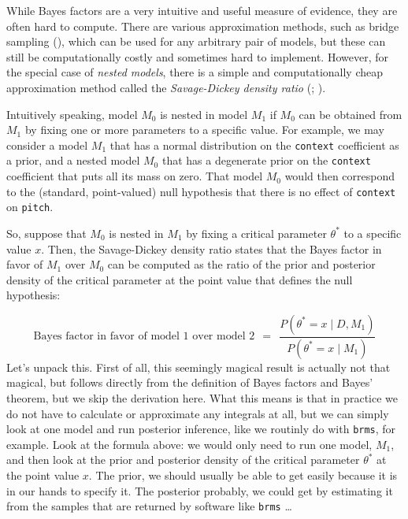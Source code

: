 \documentclass[
  doc,
  floatsintext,
  longtable,
  nolmodern,
  notxfonts,
  notimes,
  colorlinks=true,linkcolor=blue,citecolor=blue,urlcolor=blue]{apa7}
\begin{document}
While Bayes factors are a very intuitive and useful measure of evidence,
they are often hard to compute. There are various approximation methods,
such as bridge sampling
(), which can be used for any arbitrary pair of models, but these
can still be computationally costly and sometimes hard to implement.
However, for the special case of \emph{nested models}, there is a simple
and computationally cheap approximation method called the
\emph{Savage-Dickey density ratio}
(;
).

Intuitively speaking, model \(M_0\) is nested in model \(M_1\) if
\(M_0\) can be obtained from \(M_1\) by fixing one or more parameters to
a specific value. For example, we may consider a model \(M_1\) that has
a normal distribution on the \texttt{context} coefficient as a prior,
and a nested model \(M_0\) that has a degenerate prior on the
\texttt{context} coefficient that puts all its mass on zero. That model
\(M_0\) would then correspond to the (standard, point-valued) null
hypothesis that there is no effect of \texttt{context} on
\texttt{pitch}.

So, suppose that \(M_0\) is nested in \(M_1\) by fixing a critical
parameter \(\theta^*\) to a specific value \(x\). Then, the
Savage-Dickey density ratio states that the Bayes factor in favor of
\(M_1\) over \(M_0\) can be computed as the ratio of the prior and
posterior density of the critical parameter at the point value that
defines the null hypothesis:

\[
\text{Bayes factor in favor of model 1 over model 2} \ \  = \ \  \frac{P(\theta^*=x \mid D, M_1)}{P(\theta^*=x \mid M_1)}
\] Let's unpack this. First of all, this seemingly magical result is
actually not that magical, but follows directly from the definition of
Bayes factors and Bayes' theorem, but we skip the derivation here. What
this means is that in practice we do not have to calculate or
approximate any integrals at all, but we can simply look at one model
and run posterior inference, like we routinly do with \texttt{brms}, for
example. Look at the formula above: we would only need to run one model,
\(M_1\), and then look at the prior and posterior density of the
critical parameter \(\theta^*\) at the point value \(x\). The prior, we
should usually be able to get easily because it is in our hands to
specify it. The posterior probably, we could get by estimating it from
the samples that are returned by software like \texttt{brms} \ldots{}
\end{document}
